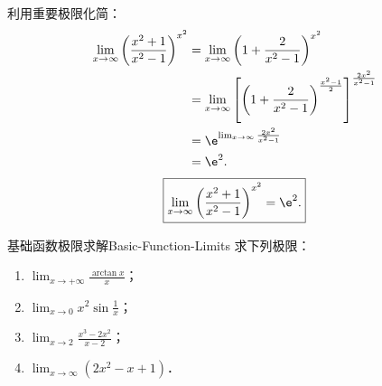 \begin{solution}

    利用重要极限化简：
    \begin{equation}
        \begin{aligned}
            \lim_{x\to\infty} \left( \frac{x^2+1}{x^2-1} \right)^{x^2} & = \lim_{x\to\infty} \left( 1 + \frac{2}{x^2-1} \right)^{x^2}                                                 \\
                                                                       & = \lim_{x\to\infty} \left[ \left( 1 + \frac{2}{x^2-1} \right)^{\frac{x^2-1}{2}} \right]^{\frac{2x^2}{x^2-1}} \\
                                                                       & = \e^{\lim_{x\to\infty} \frac{2x^2}{x^2-1}}                                                                  \\
                                                                       & = \e^2.
        \end{aligned}
    \end{equation}
    \begin{equation}
        \boxed{\lim_{x\to\infty} \left( \frac{x^2+1}{x^2-1} \right)^{x^2} = \e^2.}
    \end{equation}
\end{solution}

\begin{problem}{基础函数极限求解}{Basic-Function-Limits}
    求下列极限：
    \begin{enumerate}
        \item $\lim_{x\to +\infty} \frac{\arctan x}{x}$；
        \item $\lim_{x\to 0} x^2 \sin \frac{1}{x}$；
        \item $\lim_{x\to 2} \frac{x^3 - 2x^2}{x - 2}$；
        \item $\lim_{x\to\infty} (2x^2 - x + 1)$．
    \end{enumerate}
\end{problem}

